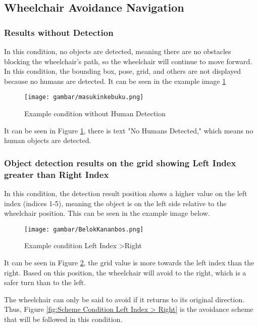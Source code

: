 \subsection{Wheelchair Avoidance Navigation}

\subsubsection{Results without Detection}
In this condition, no objects are detected, meaning there are no obstacles blocking the wheelchair's path, so the wheelchair will continue to move forward. In this condition, the bounding box, pose, grid, and others are not displayed because no humans are detected. It can be seen in the example image \ref{fig:Condition without detection}

\begin{figure}[H]
    \centering
    \texttt{[image: gambar/masukinkebuku.png]}
    \caption{Example condition without Human Detection}
    \label{fig:Condition without detection}
\end{figure}

It can be seen in Figure \ref{fig:Condition without detection}, there is text "No Humans Detected," which means no human objects are detected.

\subsubsection{Object detection results on the grid showing Left Index greater
than Right Index}
In this condition, the detection result position shows a higher value on the left index (indices 1-5), meaning the object is on the left side relative to the wheelchair position. This can be seen in the example image below.

\begin{figure}[H]
  \centering
  \texttt{[image: gambar/BelokKananbos.png]}
  \caption{Example condition Left Index \textgreater Right}
  \label{fig:Condition Left Index > Right}
\end{figure}

It can be seen in Figure \ref{fig:Condition Left Index > Right}, the grid value is more towards the left index than the right. Based on this position, the wheelchair will avoid to the right, which is a safer turn than to the left.

The wheelchair can only be said to avoid if it returns to its original direction. Thus, Figure \ref{fig:Scheme Condition Left Index > Right} is the avoidance scheme that will be followed in this condition.

